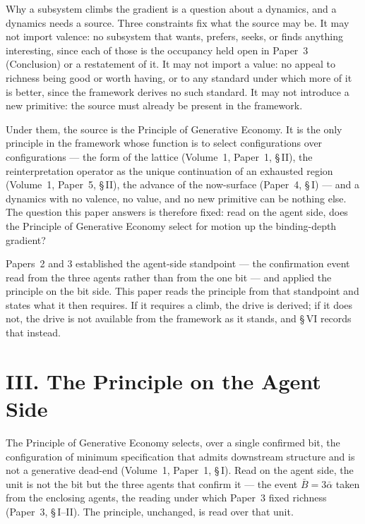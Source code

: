 \documentclass[11pt,oneside]{report}
\theoremstyle{definition}
\theoremstyle{remark}
\begin{document}
Why a subsystem climbs the gradient is a question about a dynamics, and a dynamics
needs a source. Three constraints fix what the source may be. It may not import
valence: no subsystem that wants, prefers, seeks, or finds anything interesting,
since each of those is the occupancy held open in Paper~3 (Conclusion) or a
restatement of it. It may not import a value: no appeal to richness being good or
worth having, or to any standard under which more of it is better, since the
framework derives no such standard. It may not introduce a new primitive: the source
must already be present in the framework.

Under them, the source is the Principle of Generative Economy. It is the only
principle in the framework whose function is to select configurations over
configurations --- the form of the lattice (Volume~1, Paper~1, \S\,II), the
reinterpretation operator as the unique continuation of an exhausted region
(Volume~1, Paper~5, \S\,II), the advance of the now-surface (Paper~4, \S\,I) --- and a
dynamics with no valence, no value, and no new primitive can be nothing else. The
question this paper answers is therefore fixed: read on the agent side, does the
Principle of Generative Economy select for motion up the binding-depth gradient?

Papers~2 and 3 established the agent-side standpoint --- the confirmation event read
from the three agents rather than from the one bit --- and applied the principle on
the bit side. This paper reads the principle from that standpoint and states what it
then requires. If it
requires a climb, the drive is derived; if it does not, the drive is not available
from the framework as it stands, and \S\,VI records that instead.


\section*{III. The Principle on the Agent Side}

The Principle of Generative Economy selects, over a single confirmed bit, the
configuration of minimum specification that admits downstream structure and is not a
generative dead-end (Volume~1, Paper~1, \S\,I). Read on the agent side, the unit is
not the bit but the three agents that confirm it --- the event
\ensuremath{\bar{B} = 3\bar{\alpha}} taken from the enclosing agents, the reading under
which Paper~3 fixed richness (Paper~3, \S\,I--II). The principle, unchanged, is read
over that unit.
\end{document}
